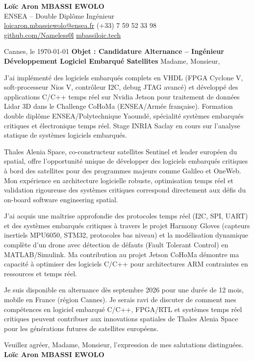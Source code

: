 \documentclass[a4paper,11pt]{article}
\begin{document}
\noindent \textbf{Lo\"ic Aron MBASSI EWOLO} \\
ENSEA -- Double Dipl\^ome Ing\'enieur \\
\href{mailto:loicaron.mbassiewolo@ensea.fr}{loicaron.mbassiewolo@ensea.fr} \quad (+33) 7 59 52 33 98 \\
\href{https://github.com/Nameless0l}{github.com/Nameless0l} \quad \href{https://mbassiloic.tech}{mbassiloic.tech}

\vspace{1em}\noindent Cannes, le \today
\vspace{1em}\noindent \textbf{Objet : Candidature Alternance -- Ing\'enieur Développement Logiciel Embarqué Satellites}
\vspace{1.5em}\noindent Madame, Monsieur,

\vspace{0.8em}\noindent J'ai impl\'ement\'e des logiciels embarqu\'es complets en VHDL (FPGA Cyclone V, soft-processeur Nios V, contrôleur I2C, debug JTAG avanc\'e) et d\'evelopp\'e des applications C/C++ temps r\'eel sur Nvidia Jetson pour traitement de données Lidar 3D dans le Challenge CoHoMa (ENSEA/Armée française). Formation double diplôme ENSEA/Polytechnique Yaoundé, spécialité systèmes embarqués critiques et électronique temps réel. Stage INRIA Saclay en cours sur l'analyse statique de systèmes logiciels embarqués.

\vspace{0.8em}\noindent Thales Alenia Space, co-constructeur satellites Sentinel et leader européen du spatial, offre l'opportunité unique de développer des logiciels embarqués critiques à bord des satellites pour des programmes majeurs comme Galileo et OneWeb. Mon expérience en architecture logicielle robuste, optimisation temps réel et validation rigoureuse des systèmes critiques correspond directement aux défis du on-board software engineering spatial.

\vspace{0.8em}\noindent J'ai acquis une maîtrise approfondie des protocoles temps réel (I2C, SPI, UART) et des systèmes embarqués critiques à travers le projet Harmony Gloves (capteurs inertiels MPU6050, STM32, protocoles bas niveau) et la modélisation dynamique complète d'un drone avec détection de défauts (Fault Tolerant Control) en MATLAB/Simulink. Ma contribution au projet Jetson CoHoMa démontre ma capacité à optimiser des logiciels C/C++ pour architectures ARM contraintes en ressources et temps réel.

\vspace{0.8em}\noindent Je suis disponible en alternance dès septembre 2026 pour une durée de 12 mois, mobile en France (région Cannes). Je serais ravi de discuter de comment mes compétences en logiciel embarqué C/C++, FPGA/RTL et systèmes temps réel critiques peuvent contribuer aux innovations spatiales de Thales Alenia Space pour les générations futures de satellites européens.

\vspace{1.5em}\noindent Veuillez agr\'eer, Madame, Monsieur, l'expression de mes salutations distingu\'ees.
\vspace{2em}\noindent \textbf{Lo\"ic Aron MBASSI EWOLO}
\end{document}
